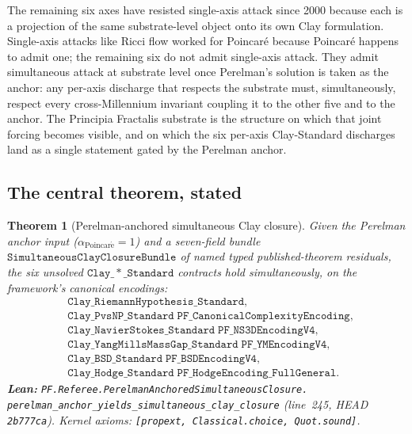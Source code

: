 \documentclass[11pt,a4paper]{article}
\theoremstyle{plain}
\newtheorem{theorem}{Theorem}[section]
\theoremstyle{definition}
\begin{document}
\medskip

The remaining six axes have resisted single-axis attack since
2000 because each is a projection of the same substrate-level
object onto its own Clay formulation. Single-axis attacks like
Ricci flow worked for Poincar\'e because Poincar\'e happens to
admit one; the remaining six do not admit single-axis attack.
They admit simultaneous attack at substrate level once Perelman's
solution is taken as the anchor: any per-axis discharge that
respects the substrate must, simultaneously, respect every
cross-Millennium invariant coupling it to the other five and to
the anchor. The Principia Fractalis substrate is the structure on
which that joint forcing becomes visible, and on which the six
per-axis Clay-Standard discharges land as a single statement
gated by the Perelman anchor.

\subsection{The central theorem, stated}
\label{sec:central-statement}

\begin{theorem}[Perelman-anchored simultaneous Clay closure]
\label{thm:central}
Given the Perelman anchor input
($\alpha_{\mathrm{Poincar\acute e}} = 1$) and a seven-field
bundle $\mathtt{SimultaneousClayClosureBundle}$ of named typed
published-theorem residuals, the six unsolved
$\mathtt{Clay\_*\_Standard}$ contracts hold simultaneously, on
the framework's canonical encodings:
\begin{align*}
&\mathtt{Clay\_RiemannHypothesis\_Standard}, \\
&\mathtt{Clay\_PvsNP\_Standard\;PF\_CanonicalComplexityEncoding}, \\
&\mathtt{Clay\_NavierStokes\_Standard\;PF\_NS3DEncodingV4}, \\
&\mathtt{Clay\_YangMillsMassGap\_Standard\;PF\_YMEncodingV4}, \\
&\mathtt{Clay\_BSD\_Standard\;PF\_BSDEncodingV4}, \\
&\mathtt{Clay\_Hodge\_Standard\;PF\_HodgeEncoding\_FullGeneral}.
\end{align*}
\textbf{Lean:}
\texttt{PF.Referee.PerelmanAnchoredSimultaneousClosure.\\
perelman\_anchor\_yields\_simultaneous\_clay\_closure}
(line~245, HEAD \texttt{2b777ca}). Kernel axioms:
\texttt{[propext, Classical.choice, Quot.sound]}.
\end{theorem}
\end{document}
